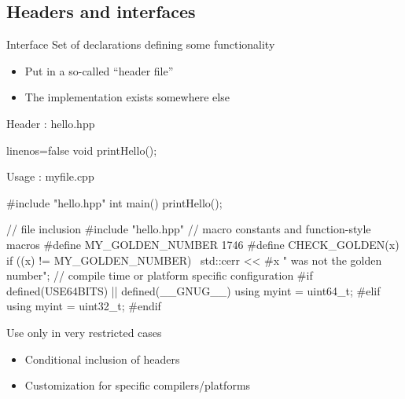 \subsection[.h]{Headers and interfaces}

\begin{frame}[fragile]
  \begin{block}{Interface}
    Set of declarations defining some functionality
    \begin{itemize}
    \item Put in a so-called ``header file''
    \item The implementation exists somewhere else
    \end{itemize}
  \end{block}
  \begin{block}{Header : hello.hpp}
    \begin{cppcode*}{linenos=false}
      void printHello();
    \end{cppcode*}
  \end{block}
  \begin{block}{Usage : myfile.cpp}
    \begin{cppcode*}{}
      #include "hello.hpp"
      int main() {
        printHello();
      }
    \end{cppcode*}
  \end{block}
\end{frame}

\begin{frame}[fragile]
  \begin{cppcode}
    // file inclusion
    #include "hello.hpp"
    // macro constants and function-style macros
    #define MY_GOLDEN_NUMBER 1746
    #define CHECK_GOLDEN(x) if ((x) != MY_GOLDEN_NUMBER) \
      std::cerr << #x " was not the golden number\n";
    // compile time or platform specific configuration
    #if defined(USE64BITS) || defined(__GNUG__)
      using myint = uint64_t;
    #elif
      using myint = uint32_t;
    #endif
  \end{cppcode}
  \pause
  \begin{block}{Use only in very restricted cases}
    \begin{itemize}
    \item Conditional inclusion of headers
    \item Customization for specific compilers/platforms
    \end{itemize}
  \end{block}
\end{frame}

